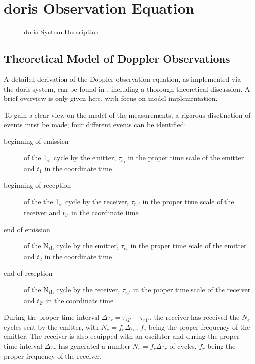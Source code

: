 \section{\gls{doris} Observation Equation}\label{sec:doris-observation-equation}

\begin{figure}
  \centering
  
  \caption{\gls{doris} System Description}
  \label{fig:doris-system-description}
\end{figure}

\subsection{Theoretical Model of Doppler Observations}\label{ssec:doris-obs-theory}
A detailed derivation of the Doppler observation equation, as implemented via the 
\gls{doris} system, can be found in \cite{Lemoine2016}, including a thorough theoretical 
discussion. A brief overview is only given here, with focus on model implementation.

To gain a clear view on the model of the measurements, a rigorous disctinction of 
events must be made; four different events can be identified:
\begin{description}
    \item[beginning of emission] of the 1\textsubscript{st} cycle by the emitter, 
    \(\tau_{e_1}\) in the proper time scale of the emitter and \(t_1\) in the coordinate 
    time
    
    \item[beginning of reception] of the the 1\textsubscript{st} cycle by the receiver, 
    \(\tau_{r_1'}\) in the proper time scale of the receiver and 
    \(t_{1'}\) in the coordinate time

    \item[end of emission] of the N\textsubscript{th} cycle by the emitter, 
    \(\tau_{e_2}\) in the proper time scale of the emitter and \(t_2\) in the coordinate 
    time
    
    \item[end of reception] of the N\textsubscript{th} cycle by the receiver, 
    \(\tau_{r_2'}\) in the proper time scale of the receiver and 
    \(t_{2'}\) in the coordinate time
\end{description}

During the proper time interval $\Delta\tau_{r} = \tau_{r2'} - \tau_{r1'}$, 
the receiver has received the $N_e$ cycles sent by the emitter, with $N_e = f_e \Delta\tau_e$, 
$f_e$ being the proper frequency of the emitter. The receiver is also equipped with
an oscilator and during the proper time interval $\Delta\tau_{r}$ has generated 
a number $N_r = f_r \Delta\tau_r$ of cycles, $f_r$ being the proper frequency of the 
receiver.

